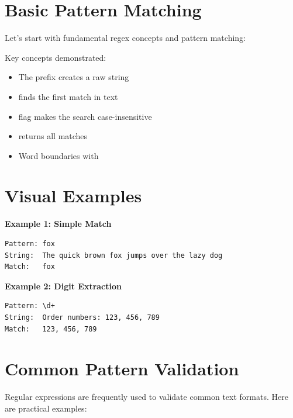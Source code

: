 \section{Basic Pattern Matching}

Let's start with fundamental regex concepts and pattern matching:

\begin{macterminal}

\end{macterminal}

Key concepts demonstrated:
\begin{itemize}
    \item The  prefix creates a raw string
    \item {} finds the first match in text
    \item {} flag makes the search case-insensitive
    \item {} returns all matches
    \item Word boundaries with 
\end{itemize}

\section{Visual Examples}

\textbf{Example 1: Simple Match}

\begin{verbatim}
Pattern: fox
String:  The quick brown fox jumps over the lazy dog
Match:   fox
\end{verbatim}

\textbf{Example 2: Digit Extraction}

\begin{verbatim}
Pattern: \d+
String:  Order numbers: 123, 456, 789
Match:   123, 456, 789
\end{verbatim}

\section{Common Pattern Validation}

Regular expressions are frequently used to validate common text formats. Here are practical examples:

\begin{macterminal}

\end{macterminal}

